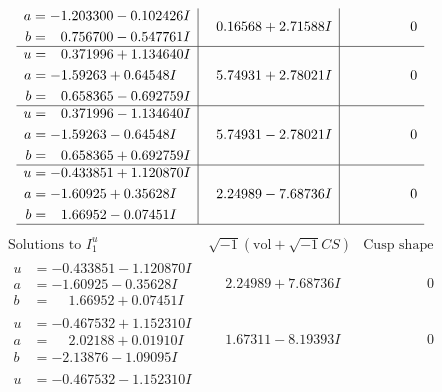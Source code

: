 \documentclass[1p]{elsarticle_modified}
\theoremstyle{definition}
\newcommand{\I}{\sqrt{-1}}
\begin{document}
$$\begin{array}{c|c|c}
\begin{aligned}
a &= -1.203300 - 0.102426 I \\
b &= \phantom{-}0.756700 - 0.547761 I\end{aligned}
 & \phantom{-}0.16568 + 2.71588 I & \phantom{-0.000000 } 0 \\ \hline\begin{aligned}
u &= \phantom{-}0.371996 + 1.134640 I \\
a &= -1.59263 + 0.64548 I \\
b &= \phantom{-}0.658365 - 0.692759 I\end{aligned}
 & \phantom{-}5.74931 + 2.78021 I & \phantom{-0.000000 } 0 \\ \hline\begin{aligned}
u &= \phantom{-}0.371996 - 1.134640 I \\
a &= -1.59263 - 0.64548 I \\
b &= \phantom{-}0.658365 + 0.692759 I\end{aligned}
 & \phantom{-}5.74931 - 2.78021 I & \phantom{-0.000000 } 0 \\ \hline\begin{aligned}
u &= -0.433851 + 1.120870 I \\
a &= -1.60925 + 0.35628 I \\
b &= \phantom{-}1.66952 - 0.07451 I\end{aligned}
 & \phantom{-}2.24989 - 7.68736 I & \phantom{-0.000000 } 0\\
 \hline 
 \end{array}$$\newpage$$\begin{array}{c|c|c}  
\text{Solutions to }I^u_{1}& \I (\text{vol} + \sqrt{-1}CS) & \text{Cusp shape}\\
 \hline 
\begin{aligned}
u &= -0.433851 - 1.120870 I \\
a &= -1.60925 - 0.35628 I \\
b &= \phantom{-}1.66952 + 0.07451 I\end{aligned}
 & \phantom{-}2.24989 + 7.68736 I & \phantom{-0.000000 } 0 \\ \hline\begin{aligned}
u &= -0.467532 + 1.152310 I \\
a &= \phantom{-}2.02188 + 0.01910 I \\
b &= -2.13876 - 1.09095 I\end{aligned}
 & \phantom{-}1.67311 - 8.19393 I & \phantom{-0.000000 } 0 \\ \hline\begin{aligned}
u &= -0.467532 - 1.152310 I \\

\end{aligned}
\end{array}$$
\end{document}
